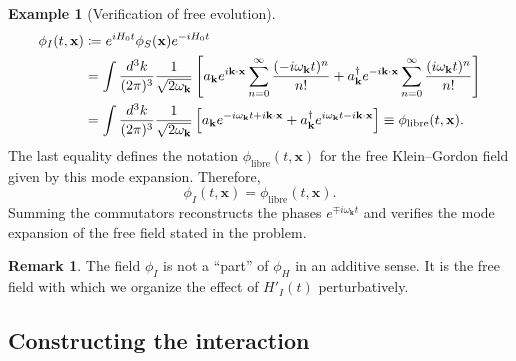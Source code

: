 \documentclass[11pt,letterpaper]{article}
\theoremstyle{definition}
\theoremstyle{definition}
\newtheorem{observacion}{Remark}
\newtheorem{ejemplo}{Example}
\newcommand{\eqbox}[1]{\boxed{\displaystyle #1}}
\begin{document}
\begin{ejemplo}[Verification of free evolution]
\begin{align}
  \phi_I(t,\mathbf{x})
  &\coloneqq e^{iH_0t}\phi_S(\mathbf{x})e^{-iH_0t}
  \notag\\
  &=
  \int\frac{d^3k}{(2\pi)^3}
  \frac{1}{\sqrt{2\omega_{\mathbf{k}}}}
  \left[
    a_{\mathbf{k}}e^{i\mathbf{k}\cdot\mathbf{x}}
    \sum_{n=0}^{\infty}\frac{(-i\omega_{\mathbf{k}}t)^n}{n!}
    +
    a_{\mathbf{k}}^\dagger e^{-i\mathbf{k}\cdot\mathbf{x}}
    \sum_{n=0}^{\infty}\frac{(i\omega_{\mathbf{k}}t)^n}{n!}
  \right]
  \notag\\
  &=
  \int\frac{d^3k}{(2\pi)^3}
  \frac{1}{\sqrt{2\omega_{\mathbf{k}}}}
  \left[
    a_{\mathbf{k}}e^{-i\omega_{\mathbf{k}}t+i\mathbf{k}\cdot\mathbf{x}}
    +
    a_{\mathbf{k}}^\dagger
    e^{i\omega_{\mathbf{k}}t-i\mathbf{k}\cdot\mathbf{x}}
  \right]
  \equiv\phi_{\mathrm{libre}}(t,\mathbf{x}).
  \label{eq:BCHsubstitutionField}
\end{align}
The last equality defines the notation $\phi_{\mathrm{libre}}(t,\mathbf{x})$
for the free Klein--Gordon field given by this mode expansion. Therefore,
\begin{equation}
  \eqbox{\phi_I(t,\mathbf{x})=\phi_{\mathrm{libre}}(t,\mathbf{x}).}
  \label{eq:BCHrecoversField}
\end{equation}
Summing the commutators reconstructs the phases $e^{\mp i\omega_{\mathbf{k}}t}$
and verifies the mode expansion of the free field stated in the problem.
\end{ejemplo}

\begin{observacion}
The field $\phi_I$ is not a ``part'' of $\phi_H$ in an additive sense.
It is the free field with which we organize the effect of $H'_I(t)$
perturbatively.
\end{observacion}

\subsection{Constructing the interaction}
\end{document}
